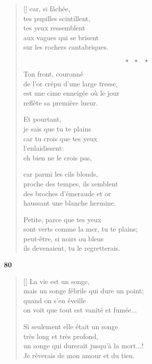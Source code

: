 \documentclass[a4paper,12pt]{book}
\begin{document}
\begin{verse}[\versewidth]
  car, si fâchée, \\
  tes pupilles scintillent, \\
  tes yeux ressemblent \\
  aux vagues qui se brisent \\
  sur les rochers cantabriques.

  $$\star \ \ \ \star \ \ \ \star$$

  Ton front, couronné \\
  de l'or crépu d'une large tresse, \\
  est une cime enneigée où le jour \\
  reflète sa première lueur.

  Et pourtant, \\
  je sais que tu te plains \\
  car tu crois que tes yeux \\
  l'enlaidissent: \\
  eh bien ne le crois pas,

  car parmi les cils blonds, \\
  proche des tempes, ils semblent \\
  des broches d'émeraude et or \\
  haussant une blanche hermine.

  Petite, parce que tes yeux \\
  sont verts comme la mer, tu te plains; \\
  peut-être, si noirs ou bleus \\
  ils devenaient, tu le regretterais.
\end{verse}

\bigskip

\begin{center}
  \textbf{80}
\end{center}

\settowidth{\versewidth}{un songe qui durerait jusqu'à la mort...!}

\begin{verse}[\versewidth]
  La vie est un songe, \\
  mais un songe fébrile qui dure un point; \\
  quand on s'en éveille \\
  on voit que tout est vanité et fumée...

  Si seulement elle était un songe \\
  très long et très profond, \\
  un songe qui durerait jusqu'à la mort...! \\
  Je rêverais de mon amour et du tien.
\end{verse}
\end{document}
